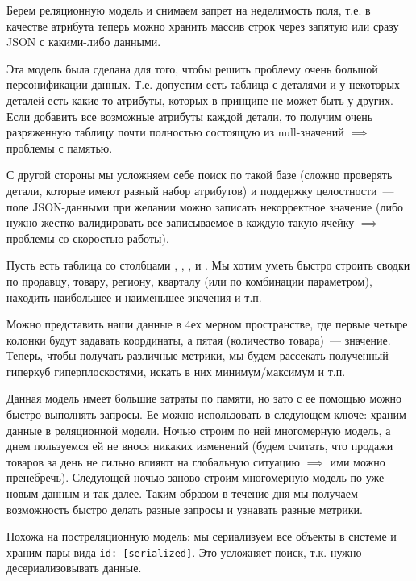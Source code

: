 
Берем реляционную модель и снимаем запрет на неделимость поля, т.е. в качестве
атрибута теперь можно хранить массив строк через запятую или сразу JSON с
какими-либо данными.

Эта модель была сделана для того, чтобы решить проблему очень большой
персонификации данных. Т.е. допустим есть таблица с деталями и у некоторых
деталей есть какие-то атрибуты, которых в принципе не может быть у других. Если
добавить все возможные атрибуты каждой детали, то получим очень разряженную
таблицу почти полностью состоящую из null-значений \(\implies\) проблемы с
памятью.

С другой стороны мы усложняем себе поиск по такой базе (сложно проверять детали,
которые имеют разный набор атрибутов) и поддержку целостности~---  поле
JSON-данными при желании можно записать некорректное значение (либо нужно жестко
валидировать все записываемое в каждую такую ячейку \(\implies\) проблемы со
скоростью работы).


Пусть есть таблица со столбцами , , ,
 и . Мы хотим уметь быстро строить сводки по
продавцу, товару, региону, кварталу (или по комбинации параметром), находить
наибольшее и наименьшее значения и т.п.

Можно представить наши данные в 4ех мерном пространстве, где первые четыре
колонки будут задавать координаты, а пятая (количество товара)~--- значение.
Теперь, чтобы получать различные метрики, мы будем рассекать полученный гиперкуб
гиперплоскостями, искать в них минимум/максимум и т.п.

Данная модель имеет большие затраты по памяти, но зато с ее помощью можно быстро
выполнять запросы. Ее можно использовать в следующем ключе: храним данные в
реляционной модели. Ночью строим по ней многомерную модель, а днем пользуемся ей
не внося никаких изменений (будем считать, что продажи товаров за день не сильно
влияют на глобальную ситуацию \(\implies\) ими можно пренебречь). Следующей
ночью заново строим многомерную модель по уже новым данным и так далее. Таким
образом в течение дня мы получаем возможность быстро делать разные запросы и
узнавать разные метрики.


Похожа на постреляционную модель: мы сериализуем все объекты в системе и храним
пары вида \texttt{id: [serialized]}. Это усложняет поиск, т.к. нужно
десериализовывать данные.
